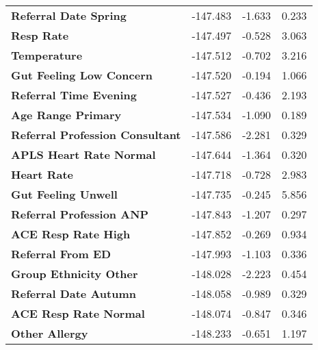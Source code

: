 {\begin{longtable}[H]{llll}
        \textbf{Referral Date Spring}           & -147.483           & -1.633              & 0.233                \\
        \textbf{Resp Rate}                       & -147.497           & -0.528              & 3.063                \\
        \textbf{Temperature}                             & -147.512           & -0.702              & 3.216                \\
        \textbf{Gut Feeling Low Concern}        & -147.520           & -0.194              & 1.066                \\
        \textbf{Referral Time Evening}          & -147.527           & -0.436              & 2.193                \\
        \textbf{Age Range Primary}              & -147.534           & -1.090              & 0.189                \\
        \textbf{Referral Profession Consultant} & -147.586           & -2.281              & 0.329                \\
        \textbf{APLS Heart Rate Normal}   & -147.644           & -1.364              & 0.320                \\
        \textbf{Heart Rate}                      & -147.718           & -0.728              & 2.983                \\
        \textbf{Gut Feeling Unwell}             & -147.735           & -0.245              & 5.856                \\
        \textbf{Referral Profession ANP}        & -147.843           & -1.207              & 0.297                \\
        \textbf{ACE Resp Rate High}       & -147.852           & -0.269              & 0.934                \\
        \textbf{Referral From ED}               & -147.993           & -1.103              & 0.336                \\
        \textbf{Group Ethnicity Other}          & -148.028           & -2.223              & 0.454                \\
        \textbf{Referral Date Autumn}           & -148.058           & -0.989              & 0.329                \\
        \textbf{ACE Resp Rate Normal}     & -148.074           & -0.847              & 0.346                \\
        \textbf{Other Allergy}                & -148.233           & -0.651              & 1.197                \\

\end{longtable}}
